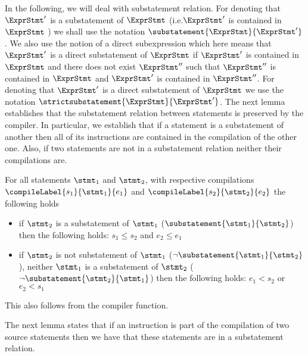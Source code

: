 In the following,  we will deal with substatement relation. For denoting that  $\ExprStmt'$ is a substatement of  $\ExprStmt$ (i.e.$\ExprStmt'$ is contained in  $\ExprStmt$  )
we shall use the notation $\substatement{\ExprStmt }{\ExprStmt'}$. 
We also use the notion of a direct subexpression which here means that  $\ExprStmt'$ is a direct substatement of  $\ExprStmt$
if $\ExprStmt'$  is contained in $\ExprStmt$ 
and there does not exist  $\ExprStmt''$  such that  $\ExprStmt''$ is contained in   $\ExprStmt$ and  $\ExprStmt'$ is contained in  $\ExprStmt''$.
For denoting that  $\ExprStmt'$ is a direct substatement of  $\ExprStmt$
we use the notation $\strictsubstatement{\ExprStmt }{\ExprStmt'}$.
The next lemma establishes that the substatement relation between statements is preserved by the compiler. 
In particular, we establish that if a statement is a substatement of another then all of its instructions are contained in 
the compilation of the other one. Also, if two statements are not in a substatement relation neither their compilations are.
\begin{compPropApp}\label{compile:prop:compProp6}
   For all statements $\stmt_1$ and $\stmt_2$, with respective compilations 
   $\compileLabel{s_1}{\stmt_1}{e_1}$ and  $\compileLabel{s_2}{\stmt_2}{e_2}$ the following holds
   \begin{itemize} 
         \item if $\stmt_2$ is a substatement of  $\stmt_1$ ($\substatement{\stmt_1}{\stmt_2}$) then the following holds:
	     $s_1 \le s_2$ and $ e_2 \le e_1$
	  \item if  $\stmt_2$ is not  substatement of  $\stmt_1$ ($\neg \substatement{\stmt_1}{\stmt_2}$), neither $\stmt_1$ is a substatement of  $\stmt_2$ 
                ($\neg \substatement{\stmt_2}{\stmt_1}$) then the following holds:
	     $e_1 < s_2  $ or $ e_2 < s_1$
   \end{itemize}
\end{compPropApp}
This also follows from the compiler function.


The next lemma states that if an instruction is part of the compilation 
of two source statements then we have that these statements are in a substatement relation. 

